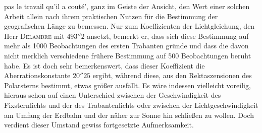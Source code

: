 pas le travail qu'il a couté', ganz im Geiste der Ansicht, den Wert einer solchen Arbeit allein nach ihrem praktischen Nutzen für die Bestimmung der geografischen Länge zu bemessen. Nur zum Koeffizienten der Lichtgleichung, den Herr \textsc{Delambre} mit $493''2$ ansetzt, bemerkt er, dass sich diese Bestimmung auf mehr als 1000 Beobachtungen des ersten Trabanten gründe und dass die davon nicht merklich verschiedene frühere Bestimmung auf 500 Beobachtungen beruht habe. Es ist doch sehr bemerkenswert, dass dieser Koeffizient die Aberrationskonstante $20''25$ ergibt, während diese, aus den Rektaszensionen des Polarsterns bestimmt, etwas größer ausfällt. Es wäre indessen vielleicht voreilig, hieraus schon auf einen Unterschied zwischen der Geschwindigkeit des Fixsternlichts und der des Trabantenlichts oder zwischen der Lichtgeschwindigkeit am Umfang der Erdbahn und der näher zur Sonne hin schließen zu wollen. Doch verdient dieser Umstand gewiss fortgesetzte Aufmerksamkeit.
\par\clearpage\endgroup

